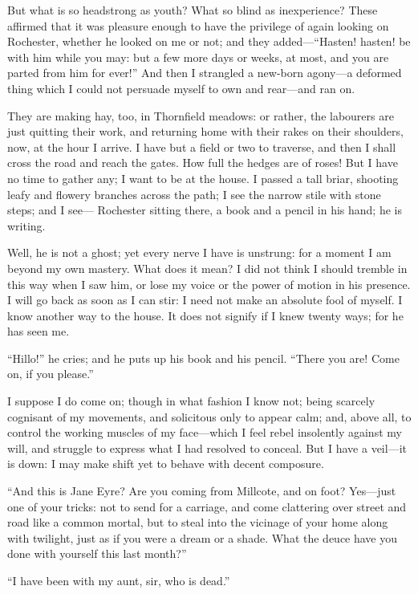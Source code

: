 But what is so headstrong as youth? What so blind as inexperience?
These affirmed that it was pleasure enough to have the privilege of
again looking on \Mr{} Rochester, whether he looked on me or not; and they
added---\enquote{Hasten! hasten! be with him while you may: but a few
	more days or weeks, at most, and you are parted from him for ever!} And
then I strangled a new-born agony---a deformed thing which I could not
persuade myself to own and rear---and ran on.

They are making hay, too, in Thornfield meadows: or rather, the
labourers are just quitting their work, and returning home with their
rakes on their shoulders, now, at the hour I arrive. I have but a field
or two to traverse, and then I shall cross the road and reach the
gates. How full the hedges are of roses! But I have no time to gather
any; I want to be at the house. I passed a tall briar, shooting leafy
and flowery branches across the path; I see the narrow stile with stone
steps; and I see---\Mr{} Rochester sitting there, a book and a pencil in
his hand; he is writing.

Well, he is not a ghost; yet every nerve I have is unstrung: for a
moment I am beyond my own mastery. What does it mean? I did not think
I should tremble in this way when I saw him, or lose my voice or the
power of motion in his presence. I will go back as soon as I can stir:
I need not make an absolute fool of myself. I know another way to the
house. It does not signify if I knew twenty ways; for he has seen me.

\enquote{Hillo!} he cries; and he puts up his book and his pencil.
\enquote{There you are! Come on, if you please.}

I suppose I do come on; though in what fashion I know not; being
scarcely cognisant of my movements, and solicitous only to appear calm;
and, above all, to control the working muscles of my face---which I feel
rebel insolently against my will, and struggle to express what I had
resolved to conceal. But I have a veil---it is down: I may make shift
yet to behave with decent composure.

\enquote{And this is Jane Eyre? Are you coming from Millcote, and on
	foot? Yes---just one of your tricks: not to send for a carriage, and
	come clattering over street and road like a common mortal, but to steal
	into the vicinage of your home along with twilight, just as if you were
	a dream or a shade. What the deuce have you done with yourself this
	last month?}

\enquote{I have been with my aunt, sir, who is dead.}

